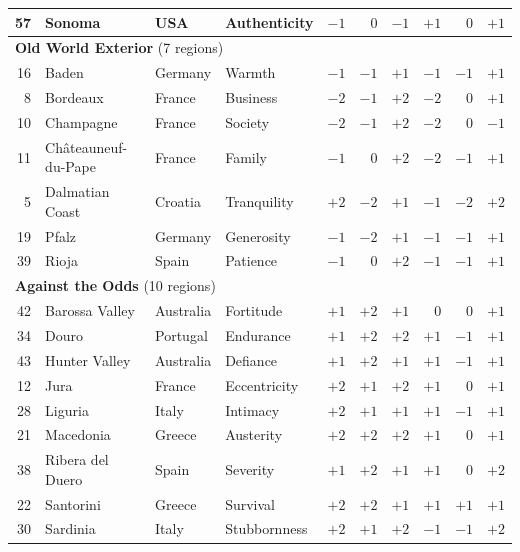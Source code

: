 \documentclass[11pt]{article}
\begin{document}
\begin{landscape}
\begin{longtable}{@{}r l l l r r r r r r@{}}
57 & Sonoma               & USA       & Authenticity         & $-1$ & $0$  & $-1$ & $+1$ & $0$  & $+1$ \\
\midrule
\multicolumn{10}{l}{\textbf{Old World Exterior} (7 regions)} \\
16 & Baden                & Germany  & Warmth                & $-1$ & $-1$ & $+1$ & $-1$ & $-1$ & $+1$ \\
8  & Bordeaux             & France   & Business              & $-2$ & $-1$ & $+2$ & $-2$ & $0$  & $+1$ \\
10 & Champagne            & France   & Society               & $-2$ & $-1$ & $+2$ & $-2$ & $0$  & $-1$ \\
11 & Ch\^ateauneuf-du-Pape & France  & Family                & $-1$ & $0$  & $+2$ & $-2$ & $-1$ & $+1$ \\
5  & Dalmatian Coast      & Croatia  & Tranquility           & $+2$ & $-2$ & $+1$ & $-1$ & $-2$ & $+2$ \\
19 & Pfalz                & Germany  & Generosity            & $-1$ & $-2$ & $+1$ & $-1$ & $-1$ & $+1$ \\
39 & Rioja                & Spain    & Patience              & $-1$ & $0$  & $+2$ & $-1$ & $-1$ & $+1$ \\
\midrule
\multicolumn{10}{l}{\textbf{Against the Odds} (10 regions)} \\
42 & Barossa Valley       & Australia & Fortitude            & $+1$ & $+2$ & $+1$ & $0$  & $0$  & $+1$ \\
34 & Douro                & Portugal  & Endurance            & $+1$ & $+2$ & $+2$ & $+1$ & $-1$ & $+1$ \\
43 & Hunter Valley        & Australia & Defiance             & $+1$ & $+2$ & $+1$ & $+1$ & $-1$ & $+1$ \\
12 & Jura                 & France    & Eccentricity         & $+2$ & $+1$ & $+2$ & $+1$ & $0$  & $+1$ \\
28 & Liguria              & Italy     & Intimacy             & $+2$ & $+1$ & $+1$ & $+1$ & $-1$ & $+1$ \\
21 & Macedonia            & Greece    & Austerity            & $+2$ & $+2$ & $+2$ & $+1$ & $0$  & $+1$ \\
38 & Ribera del Duero     & Spain     & Severity             & $+1$ & $+2$ & $+1$ & $+1$ & $0$  & $+2$ \\
22 & Santorini            & Greece    & Survival             & $+2$ & $+2$ & $+1$ & $+1$ & $+1$ & $+1$ \\
30 & Sardinia             & Italy     & Stubbornness         & $+2$ & $+1$ & $+2$ & $-1$ & $-1$ & $+2$ \\

\end{longtable}
\end{landscape}
\end{document}

